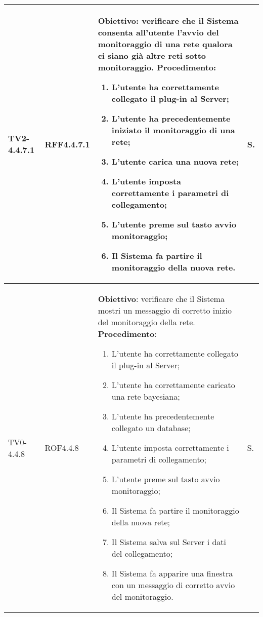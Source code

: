 \begin{longtable}{|C{.15\textwidth}|C{.13\textwidth}|m{.65\textwidth}|C{.08\textwidth}|}
TV2-4.4.7.1 & RFF4.4.7.1 &
	\textbf{Obiettivo}: verificare che il Sistema consenta all'utente l'avvio del monitoraggio di una rete qualora ci siano già altre reti sotto monitoraggio. \newline
	\textbf{Procedimento}:
	\begin{enumerate}
		\item L'utente ha correttamente collegato il plug-in al Server;
		\item L'utente ha precedentemente iniziato il monitoraggio di una rete;
		\item L'utente carica una nuova rete;
		\item L'utente imposta correttamente i parametri di collegamento;
		\item L'utente preme sul tasto avvio monitoraggio;
		\item Il Sistema fa partire il monitoraggio della nuova rete.
	\end{enumerate}
	& S. \\
\hline

TV0-4.4.8 & ROF4.4.8 &
	\textbf{Obiettivo}: verificare che il Sistema mostri un messaggio di corretto inizio del monitoraggio della rete. \newline
	\textbf{Procedimento}:
	\begin{enumerate}
		\item L'utente ha correttamente collegato il plug-in al Server;
		\item L'utente ha correttamente caricato una rete bayesiana;
		\item L'utente ha precedentemente collegato un database;
		\item L'utente imposta correttamente i parametri di collegamento;
		\item L'utente preme sul tasto avvio monitoraggio;
		\item Il Sistema fa partire il monitoraggio della nuova rete;
		\item Il Sistema salva sul Server i dati del collegamento;
		\item Il Sistema fa apparire una finestra con un messaggio di corretto avvio del monitoraggio.
	\end{enumerate}
	& S. \\
\hline


\end{longtable}
